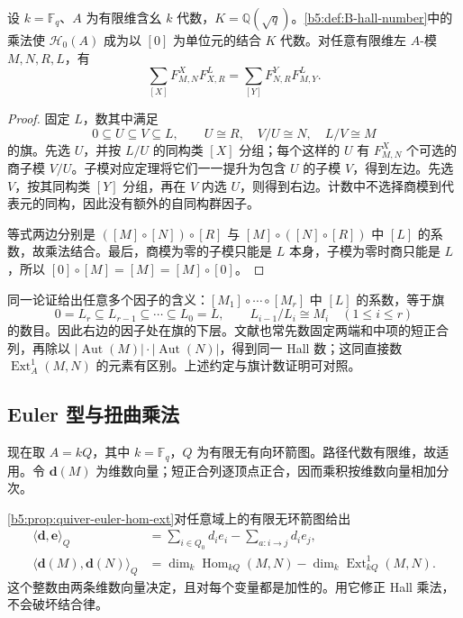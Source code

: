 \begin{proposition}\label{b5:prop:B-hall-associativity}
	设 \(k=\mathbb F_q\)、\(A\) 为有限维含幺 \(k\) 代数，\(K=\mathbb Q(\sqrt q)\)。\cref{b5:def:B-hall-number}中的乘法使 \(\mathcal H_0(A)\) 成为以 \([0]\) 为单位元的结合 \(K\) 代数。对任意有限维左 \(A\)-模 \(M,N,R,L\)，有
	\begin{equation}\label{b5:eq:B-hall-flag-identity}
		\sum_{[X]}F_{M,N}^{X}F_{X,R}^{L}
		=\sum_{[Y]}F_{N,R}^{Y}F_{M,Y}^{L}.
	\end{equation}
\end{proposition}
\begin{proof}
	固定 \(L\)，数其中满足
	\[
		0\subseteq U\subseteq V\subseteq L,
		\qquad U\cong R,\quad V/U\cong N,\quad L/V\cong M
	\]
	的旗。先选 \(U\)，并按 \(L/U\) 的同构类 \([X]\) 分组；每个这样的 \(U\) 有 \(F_{M,N}^{X}\) 个可选的商子模 \(V/U\)。子模对应定理将它们一一提升为包含 \(U\) 的子模 \(V\)，得到左边。先选 \(V\)，按其同构类 \([Y]\) 分组，再在 \(V\) 内选 \(U\)，则得到右边。计数中不选择商模到代表元的同构，因此没有额外的自同构群因子。

	等式两边分别是 \(([M]\circ[N])\circ[R]\) 与 \([M]\circ([N]\circ[R])\) 中 \([L]\) 的系数，故乘法结合。最后，商模为零的子模只能是 \(L\) 本身，子模为零时商只能是 \(L\)，所以 \([0]\circ[M]=[M]=[M]\circ[0]\)。
\end{proof}
同一论证给出任意多个因子的含义：\([M_1]\circ\cdots\circ[M_r]\) 中 \([L]\) 的系数，等于旗
\[
	0=L_r\subseteq L_{r-1}\subseteq\cdots\subseteq L_0=L,
	\qquad L_{i-1}/L_i\cong M_i\quad(1\le i\le r)
\]
的数目。因此右边的因子处在旗的下层。文献也常先数固定两端和中项的短正合列，再除以 \(|\operatorname{Aut}(M)|\cdot|\operatorname{Aut}(N)|\)，得到同一 Hall 数；这同直接数 \(\operatorname{Ext}^1_A(M,N)\) 的元素有区别。上述约定与旗计数证明可对照\cite[作者公开稿, Section 1.3, Proposition 1.1, Lemma 1.2]{Schiffmann2012HallAlgebras}。

\subsection{Euler 型与扭曲乘法}
\label{b5:subsec:B06:02}

现在取 \(A=kQ\)，其中 \(k=\mathbb F_q\)，\(Q\) 为有限无有向环箭图。路径代数有限维，故适用。令 \(\mathbf d(M)\) 为维数向量；短正合列逐顶点正合，因而乘积按维数向量相加分次。

\ProseParagraphBreak
\cref{b5:prop:quiver-euler-hom-ext}对任意域上的有限无环箭图给出
\begin{equation}\label{b5:eq:B-hall-euler}
	\begin{aligned}
	\langle\mathbf d,\mathbf e\rangle_Q
	&=\sum_{i\in Q_0}d_ie_i-\sum_{a:i\to j}d_ie_j,\\
	\langle\mathbf d(M),\mathbf d(N)\rangle_Q
	&=\dim_k\operatorname{Hom}_{kQ}(M,N)
	-\dim_k\operatorname{Ext}^1_{kQ}(M,N).
	\end{aligned}
\end{equation}
这个整数由两条维数向量决定，且对每个变量都是加性的。用它修正 Hall 乘法，不会破坏结合律。

